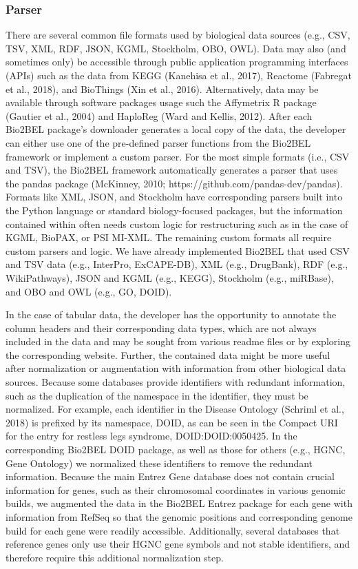 \subsubsection*{Parser}
There are several common file formats used by biological data sources (e.g., CSV, TSV, XML, RDF, JSON, KGML, Stockholm, OBO, OWL).
Data may also (and sometimes only) be accessible through public application programming interfaces (APIs) such as the data from KEGG (Kanehisa et al., 2017), Reactome (Fabregat et al., 2018), and BioThings (Xin et al., 2016).
Alternatively, data may be available through software packages usage such the Affymetrix R package (Gautier et al., 2004) and HaploReg (Ward and Kellis, 2012).
After each Bio2BEL package's downloader generates a local copy of the data, the developer can either use one of the pre-defined parser functions from the Bio2BEL framework or implement a custom parser.
For the most simple formats (i.e., CSV and TSV), the Bio2BEL framework automatically generates a parser that uses the pandas package (McKinney, 2010; https://github.com/pandas-dev/pandas).
Formats like XML, JSON, and Stockholm have corresponding parsers built into the Python language or standard biology-focused packages, but the information contained within often needs custom logic for restructuring such as in the case of KGML, BioPAX, or PSI MI-XML.
The remaining custom formats all require custom parsers and logic.
We have already implemented Bio2BEL that used CSV and TSV data (e.g., InterPro, ExCAPE-DB), XML (e.g., DrugBank), RDF (e.g., WikiPathways), JSON and KGML (e.g., KEGG), Stockholm (e.g., miRBase), and OBO and OWL (e.g., GO, DOID).

In the case of tabular data, the developer has the opportunity to annotate the column headers and their corresponding data types, which are not always included in the data and may be sought from various readme files or by exploring the corresponding website.
Further, the contained data might be more useful after normalization or augmentation with information from other biological data sources.
Because some databases provide identifiers with redundant information, such as the duplication of the namespace in the identifier, they must be normalized.
For example, each identifier in the Disease Ontology (Schriml et al., 2018) is prefixed by its namespace, DOID, as can be seen in the Compact URI for the entry for restless legs syndrome, DOID:DOID:0050425.
In the corresponding Bio2BEL DOID package, as well as those for others (e.g., HGNC, Gene Ontology) we normalized these identifiers to remove the redundant information.
Because the main Entrez Gene database does not contain crucial information for genes, such as their chromosomal coordinates in various genomic builds, we augmented the data in the Bio2BEL Entrez package for each gene with information from RefSeq so that the genomic positions and corresponding genome build for each gene were readily accessible.
Additionally, several databases that reference genes only use their HGNC gene symbols and not stable identifiers, and therefore require this additional normalization step.

